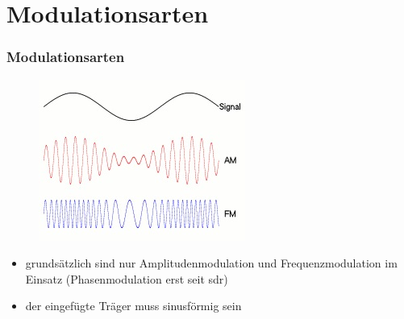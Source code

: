 \section[Arten]{Modulationsarten}
\begin{frame}
\frametitle{Modulationsarten}
\begin{center}
 \begin{figure}
      \includegraphics[width=\textwidth,height=.5\textheight,keepaspectratio]{e14/modulationen.jpg}\\
    \end{figure}

\begin{itemize}
	\item grundsätzlich sind nur Amplitudenmodulation und Frequenzmodulation im Einsatz (Phasenmodulation erst seit sdr)
	\item der eingefügte Träger muss sinusförmig sein
\end{itemize}
\end{center}
\end{frame}

